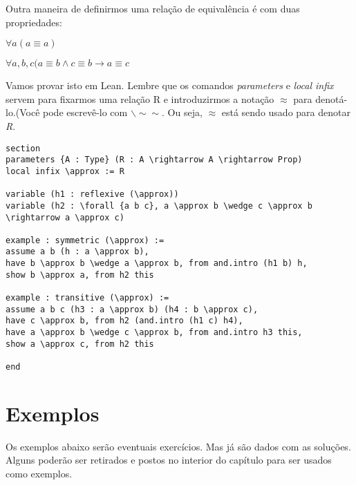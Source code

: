 Outra maneira de definirmos uma relação de equivalência é com duas propriedades:

$\forall a (a\equiv a)$

$\forall a,b,c (a\equiv b \wedge c\equiv b \rightarrow a\equiv c$

Vamos provar isto em Lean. Lembre que os comandos \textit{parameters} e \textit{local infix} servem para fixarmos uma relação R e introduzirmos a notação $\approx$ para denotá-lo.(Você pode escrevê-lo com $\backslash \sim \sim$. Ou seja, $\approx$ está sendo usado para denotar \textit{R}.
\begin{lstlisting}
section
parameters {A : Type} (R : A \rightarrow A \rightarrow Prop)
local infix \approx := R

variable (h1 : reflexive (\approx))
variable (h2 : \forall {a b c}, a \approx b \wedge c \approx b \rightarrow a \approx c)

example : symmetric (\approx) :=
assume a b (h : a \approx b),
have b \approx b \wedge a \approx b, from and.intro (h1 b) h,
show b \approx a, from h2 this

example : transitive (\approx) :=
assume a b c (h3 : a \approx b) (h4 : b \approx c),
have c \approx b, from h2 (and.intro (h1 c) h4),
have a \approx b \wedge c \approx b, from and.intro h3 this,
show a \approx c, from h2 this

end
\end{lstlisting}

\section{Exemplos}
Os exemplos abaixo serão eventuais exercícios.
Mas já são dados com as soluções. Alguns poderão ser retirados e postos no interior do capítulo para ser usados como exemplos.

